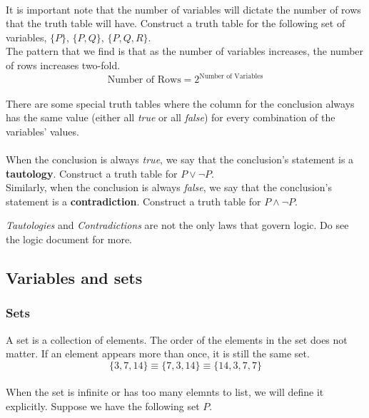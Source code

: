 \documentclass[../setup.tex]{subfiles}
\begin{document}
\\
It is important note that the number of variables will dictate the number of rows that the truth table will have. Construct a truth table for the following set of variables, $\{P\}$, $\{P, Q\}$, $\{P, Q, R\}$. \\
The pattern that we find is that as the number of variables increases, the number of rows increases two-fold. \\
\[ \text{Number of Rows} = 2^{\text{Number of Variables}} \]
\\
There are some special truth tables where the column for the conclusion always has the same value (either all \textit{true} or all \textit{false}) for every combination of the variables' values. \\
\\
When the conclusion is always \textit{true}, we say that the conclusion's statement is a \textbf{tautology}. Construct a truth table for $P\lor\lnot P$.\\
Similarly, when the conclusion is always \textit{false}, we say that the conclusion's statement is a \textbf{contradiction}. Construct a truth table for $P \land\lnot P$. \\

\begin{remark}
\textit{Tautologies} and \textit{Contradictions} are not the only laws that govern logic. Do see the logic document for more.
\end{remark}



\subsection{Variables and sets}
\subsubsection{Sets}
A set is a collection of elements. The order of the elements in the set does not matter. If an element appears more than once, it is still the same set. \\
\[ \{3, 7, 14\} \equiv \{7, 3, 14\} \equiv \{14, 3, 7, 7\} \]
\\
When the set is infinite or has too many elemnts to list, we will define it explicitly. Suppose we have the following set $P$. \\
\end{document}
